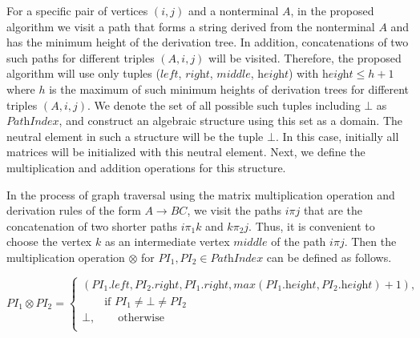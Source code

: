 For a specific pair of vertices $(i, j)$ and a nonterminal $A$, in the proposed algorithm we visit a path that forms a string derived from the nonterminal $A$ and has the minimum height of the derivation tree. In addition, concatenations of two such paths for different triples $(A, i, j)$ will be visited. Therefore, the proposed algorithm will use only tuples ($\textit{left}$, $\textit{right}$, $\textit{middle}$, $\textit{height}$) with $\textit{height} \leq h + 1$ where $h$ is the maximum of such minimum heights of derivation trees for different triples $(A, i, j)$. We denote the set of all possible such tuples including $\bot$ as $\textit{PathIndex}$, and construct an algebraic structure using this set as a domain. The neutral element in such a structure will be the tuple $\bot$. In this case, initially all matrices will be initialized with this neutral element. Next, we define the multiplication and addition operations for this structure.



In the process of graph traversal using the matrix multiplication operation and derivation rules of the form $A \to B C$, we visit the paths $i \pi j$ that are the concatenation of two shorter paths $i\pi_1 k$ and $k \pi_2 j$. Thus, it is convenient to choose the vertex $k$ as an intermediate vertex $\textit{middle}$ of the path $i \pi j$. Then the multiplication operation $\otimes$ for \mbox{$\textit{PI}_1, \textit{PI}_2 \in \textit{PathIndex}$} can be defined as follows.

$$\textit{PI}_1 \otimes \textit{PI}_2 = \begin{cases}
      (\textit{PI}_1.\textit{left}, \textit{PI}_2.\textit{right}, \textit{PI}_1.\textit{right}, max(\textit{PI}_1.\textit{height}, \textit{PI}_2.\textit{height}) + 1),\\
                     \qquad \text{if $\textit{PI}_1\neq \bot \neq \textit{PI}_2$} \\
      \bot, \qquad \text{otherwise} \\
    \end{cases}\
$$

